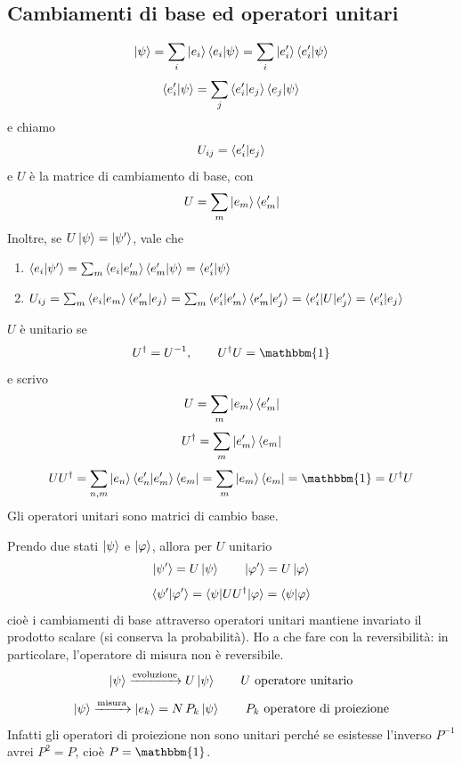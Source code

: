 \subsection{Cambiamenti di base ed operatori unitari}
\[
  \ket{\psi}
  = \sum_i \ket{e_i} \braket{e_i|\psi}
  = \sum_i \ket{e_i'}\braket{e_i'|\psi}
\]
\[
  \braket{e_i'|\psi} = \sum_j \braket{e_i'|e_j} \braket{e_j|\psi}
\]
e chiamo
\[
  U_{ij} = \braket{e_i'|e_j}
\]
e \(U\) è la matrice di cambiamento di base, con
\[
  U = \sum_m \ket{e_m} \bra{e_m'}
\]
Inoltre, se \(U \ket{\psi} = \ket{\psi'}\), vale che
\begin{enumerate}
  \item \(\braket{e_i|\psi'}
    = \sum_m \braket{e_i|e_m'} \braket{e_m'|\psi}
    = \braket{e_i'|\psi}\)
  \item \(U_{ij}
    = \sum_m \braket{e_i|e_m} \braket{e_m'|e_j}
    = \sum_m \braket{e_i'|e_m'} \braket{e_m'|e_j'} = \braket{e_i'|U|e_j'}
    = \braket{e_i'|e_j}\)
\end{enumerate}
\(U\) è unitario se
\[
  U^\dag = U^{-1}, \qquad U^\dag U = \mathbbm{1}
\]
e scrivo
\[
  U = \sum_m \ket{e_m} \bra{e_m'}
\]
\[
  U^\dag = \sum_m \ket{e_m'} \bra{e_m}
\]
\[
  U U^\dag
  = \sum_{n,m} \ket{e_n} \braket{e_n'|e_m'} \bra{e_m}
  = \sum_m \ket{e_m} \bra{e_m}
  = \mathbbm{1}
  = U^\dag U
\]
Gli operatori unitari sono matrici di cambio base.

\bigskip
\noindent
Prendo due stati \(\ket{\psi}\) e \(\ket{\varphi}\), allora per \(U\) unitario
\[
  \ket{\psi'} = U \ket{\psi} \qquad \ket{\varphi'} = U \ket{\varphi}
\]
\[
  \braket{\psi'|\varphi'} = \braket{\psi|UU^\dag|\varphi} = \braket{\psi|\varphi}
\]
cioè i cambiamenti di base attraverso operatori unitari mantiene invariato il
prodotto scalare (si conserva la probabilità). Ho a che fare con la
reversibilità: in particolare, l'operatore di misura non è reversibile.
\[
  \ket{\psi} \xrightarrow{\text{evoluzione}} U \ket{\psi}
  \qquad U \text{ operatore unitario}
\]
\[
  \ket{\psi} \xrightarrow{\text{misura}} \ket{e_k} = N \, P_k \ket{\psi}
  \qquad P_k \text{ operatore di proiezione}
\]
Infatti gli operatori di proiezione non sono unitari perché se esistesse
l'inverso \(P^{-1}\) avrei \(P^2 = P\), cioè \(P = \mathbbm{1}\).